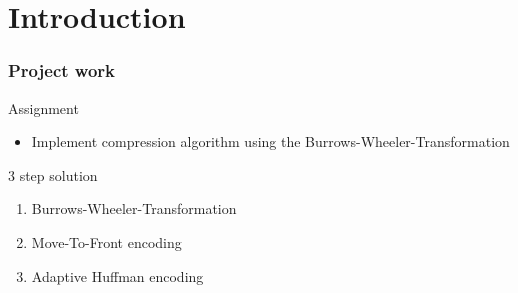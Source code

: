 \section{Introduction}

\begin{frame}
	\frametitle{Project work}
	\begin{block}{Assignment}
		\begin{itemize}
			\item Implement compression algorithm using the Burrows-Wheeler-Transformation
		\end{itemize}
	\end{block}

	\begin{block}{3 step solution}
		\begin{enumerate}
			\item Burrows-Wheeler-Transformation
			\item Move-To-Front encoding
			\item Adaptive Huffman encoding
		\end{enumerate}
	\end{block}
\end{frame}


